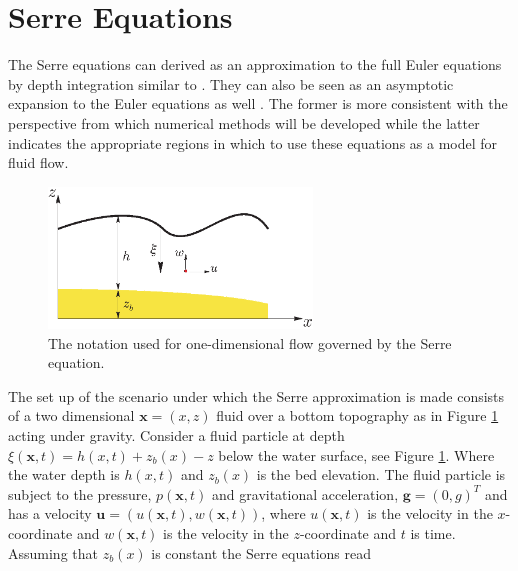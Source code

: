 \documentclass[SingleSpace,12pt,Proceedings]{Serre_ASCE}
\begin{document}
\section{Serre Equations}
\label{section:Serre Equations}
The Serre equations can derived as an approximation to the full Euler equations by depth integration similar to \cite{Su-Gardener-1969-536}. They can also be seen as an asymptotic expansion to the Euler equations as well \cite{Bonneton-Lannes-2009-16601}. The former is more consistent with the perspective from which numerical methods will be developed while the latter indicates the appropriate regions in which to use these equations as a model for fluid flow.
\begin{figure}[htb]
\begin{center}
\includegraphics[width=7.0cm]{one-dimensional-axis_Serre.eps}
\end{center}
\caption{The notation used for one-dimensional flow governed by the Serre equation.}
\label{fig:Notation}
\end{figure}
The set up of the scenario under which the Serre approximation is made consists of a two dimensional $\textbf{x} = (x,z)$ fluid over a bottom topography as in Figure \ref{fig:Notation} acting under gravity. Consider a fluid particle at depth  $\xi(\textbf{x},t) = h(x,t) + z_b(x) - z$ below the water surface, see Figure \ref{fig:Notation}. Where the water depth is $h(x,t)$ and $z_b(x)$ is the bed elevation. The fluid particle is subject to the pressure, $p(\textbf{x},t)$ and  gravitational acceleration, $\textbf{g} = (0,g)^T$ and has a velocity $\textbf{u} = (u(\textbf{x},t),w(\textbf{x},t))$,  where $u(\textbf{x},t)$ is the velocity in the $x$-coordinate and $w(\textbf{x},t)$ is the velocity in the $z$-coordinate and $t$ is time. Assuming that $z_b(x)$ is constant the Serre equations read \cite{Guyenne-etal-2014-169}
\end{document}
